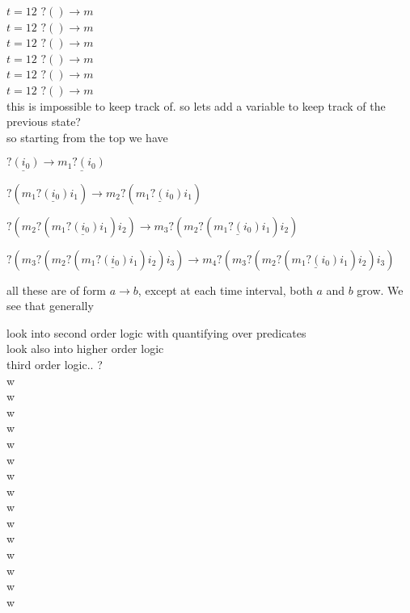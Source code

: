 \documentclass[12pt]{article}
\begin{document}
\noindent $t = 12$ $?() \rightarrow m_{}$\\
\noindent $t = 12$ $?() \rightarrow m_{}$\\
\noindent $t = 12$ $?() \rightarrow m_{}$\\
\noindent $t = 12$ $?() \rightarrow m_{}$\\
\noindent $t = 12$ $?() \rightarrow m_{}$\\
\noindent $t = 12$ $?() \rightarrow m_{}$\\

\noindent this is impossible to keep track of. so lets add a variable to keep track of the previous state?\\
so starting from the top we have
\begin{center}
$\underline{?(i_{0})} \rightarrow \underline{m_{1}?(i_{0})}$
\end{center}

\begin{center}
$?(m_{1}\underline{?(i_{0})}i_{1}) \rightarrow m_{2}?(\underline{m_{1}?(i_{0})}i_{1})$
\end{center}

\begin{center}
$?(m_{2}?(m_{1}\underline{?(i_{0})}i_{1})i_{2}) \rightarrow m_{3}?(m_{2}?(\underline{m_{1}?(i_{0})}i_{1})i_{2})$
\end{center}


\begin{center}
$?(m_{3}?(m_{2}?(m_{1}\underline{?(i_{0})}i_{1})i_{2})i_{3}) \rightarrow m_{4}?(m_{3}?(m_{2}?(\underline{m_{1}?(i_{0})}i_{1})i_{2})i_{3})$
\end{center}


\noindent all these are of form $a \rightarrow b$, except at each time interval, both $a$ and $b$ grow. We see that generally

\noindent look into second order logic with quantifying over predicates\\
\noindent look also into higher order logic\\
\noindent third order logic.. ?\\
w\\
w\\
w\\
w\\
w\\
w\\
w\\
w\\
w\\
w\\
w\\
w\\
w\\
w\\
w\\
\end{document}
